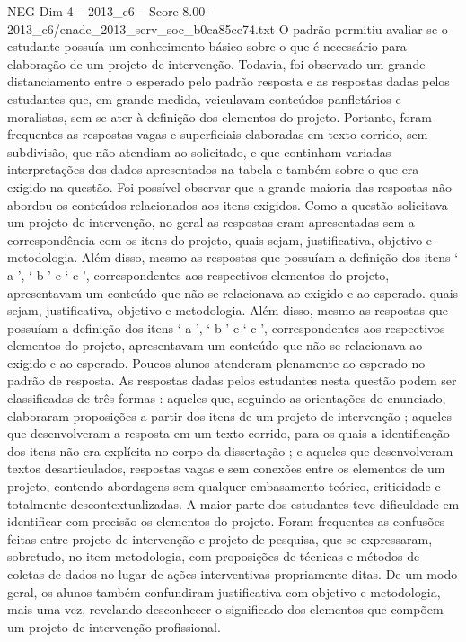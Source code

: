 \begin{textsample}{NEG Dim 4 – 2013\_c6 – Score 8.00 – 2013\_c6/enade\_2013\_serv\_soc\_b0ca85ce74.txt}
O padrão permitiu avaliar se o estudante possuía um conhecimento básico sobre o que é necessário para elaboração de um projeto de intervenção.
Todavia, foi observado um grande distanciamento entre o esperado pelo padrão resposta e as respostas dadas pelos estudantes que, em grande medida, veiculavam conteúdos panfletários e moralistas, sem se ater à definição dos elementos do projeto.
Portanto, foram frequentes as respostas vagas e superficiais elaboradas em texto corrido, sem subdivisão, que não atendiam ao solicitado, e que continham variadas interpretações dos dados apresentados na tabela e também sobre o que era exigido na questão.
Foi possível observar que a grande maioria das respostas não abordou os conteúdos relacionados aos itens exigidos.
Como a questão solicitava um projeto de intervenção, no geral as respostas eram apresentadas sem a correspondência com os itens do projeto, quais sejam, justificativa, objetivo e metodologia.
Além disso, mesmo as respostas que possuíam a definição dos itens ‘ a ’, ‘ b ’ e ‘ c ’, correspondentes aos respectivos elementos do projeto, apresentavam um conteúdo que não se relacionava ao exigido e ao esperado. quais sejam, justificativa, objetivo e metodologia.
Além disso, mesmo as respostas que possuíam a definição dos itens ‘ a ’, ‘ b ’ e ‘ c ’, correspondentes aos respectivos elementos do projeto, apresentavam um conteúdo que não se relacionava ao exigido e ao esperado.
Poucos alunos atenderam plenamente ao esperado no padrão de resposta.
As respostas dadas pelos estudantes nesta questão podem ser classificadas de três formas : aqueles que, seguindo as orientações do enunciado, elaboraram proposições a partir dos itens de um projeto de intervenção ; aqueles que desenvolveram a resposta em um texto corrido, para os quais a identificação dos itens não era explícita no corpo da dissertação ; e aqueles que desenvolveram textos desarticulados, respostas vagas e sem conexões entre os elementos de um projeto, contendo abordagens sem qualquer embasamento teórico, criticidade e totalmente descontextualizadas.
A maior parte dos estudantes teve dificuldade em identificar com precisão os elementos do projeto.
Foram frequentes as confusões feitas entre projeto de intervenção e projeto de pesquisa, que se expressaram, sobretudo, no item metodologia, com proposições de técnicas e métodos de coletas de dados no lugar de ações interventivas propriamente ditas.
De um modo geral, os alunos também confundiram justificativa com objetivo e metodologia, mais uma vez, revelando desconhecer o significado dos elementos que compõem um projeto de intervenção profissional.

\end{textsample}
